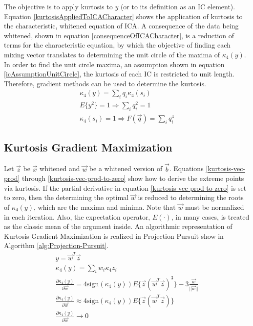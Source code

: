 \documentclass[11pt]{article}
\begin{document}
The objective is to apply kurtosis to $y$ (or to its definition as an IC element).  Equation \ref{kurtosisAppliedToICACharacter} shows the application of kurtosis to the characteristic, whitened equation of ICA.  A consequence of the data being whitened, shown in equation \ref{consequenceOfICACharacter}, is a reduction of terms for the characteristic equation,   %
by which the objective of finding each mixing vector translates to determining the unit circle of  the maxima of $\kappa_4 (y)$.  In order to find the unit circle maxima, an assumption shown in equation \ref{icAssumptionUnitCircle}, the kurtosis of each IC is restricted to unit length.  
Therefore, gradient methods can be used to determine the kurtosis.
\begin{eqnarray}
\kappa_4(y) = \sum _i q_i \kappa_4 (s_i) \label{kurtosisAppliedToICACharacter}\\ 
E\{y^2 \} =1 \Rightarrow \sum_i q_i ^2 =1 \label{consequenceOfICACharacter} \\
\kappa_4(s_i) = 1 \Rightarrow F(\vec{q}) = \sum_i q_i ^4 \label{icAssumptionUnitCircle}
\end{eqnarray}

\subsection{Kurtosis Gradient Maximization}
Let $\vec{z}$ be $\vec{x}$ whitened and $\vec{w}$ be a whitened version of $\vec{b}$. Equations \ref{kurtosis-vec-prod} through \ref{kurtosis-vec-prod-to-zero} show how to derive the extreme points via kurtosis.  
If the partial derivative in equation  \ref{kurtosis-vec-prod-to-zero} is set to zero, then the determining the optimal $\vec{w}$ is reduced to determining the roots of $\kappa_4(y)$, which are the maxima and minima.  Note that $\vec{w}$ must be normalized in  each iteration.  Also, the expectation operator, $E(\cdot)$, in many cases, is treated as the classic mean of the argument inside.  %
An algorithmic representation of Kurtosis Gradient Maximization is realized in Projection Pursuit show in Algorithm \ref{alg:Projection-Pursuit}.
\begin{eqnarray}
y = \vec{w}^T \vec{z} \\ 
\kappa_4 (y) = \sum _i w_i \kappa_4{z_i} \label{kurtosis-vec-prod} \\
\frac{\partial \kappa _4 (y)} {\partial \vec{w}} = 4 \textrm{sign} (\kappa _4 (y))E\{ \vec{z} (\vec{w}^T \vec{z})^3\} - 3 \frac{\vec{w}}{||\vec{w}||}  \\
\frac{\partial \kappa _4 (y)} {\partial \vec{w}} \approx 4 \textrm{sign} (\kappa_4(y))E \{ \vec{z} (\vec{w}^T \vec{z}) \} \\
\frac{\partial \kappa _4 (y)} {\partial \vec{w}} \to 0 \label{kurtosis-vec-prod-to-zero}
\end{eqnarray}
\end{document}
